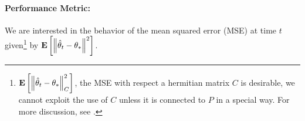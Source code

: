 \paragraph{Performance Metric:}  We are interested in the behavior of the mean squared error (MSE) at time $t$ given\footnote{ $\mathbf{E}\left[\left\| \hat{\theta}_t-\theta_*\right\|_C^2\right]$, the MSE with respect a hermitian matrix $C$ is desirable, we cannot exploit the use of $C$ unless it is connected to $P$ in a special way. For more discussion, see .}
 by $\mathbf{E}\left[\left\| \hat{\theta}_t-\theta_*\right\|^2\right]$.
\begin{comment}
\footnote{ We note here that $\EE{\norm{\thh_t-\ts}_C^2}$ which measures the MSE in the quadratic norm with respect to a positive definite matrix $C\succ 0$. However, unless $C$ has some special structure, it is not possible to exploit this generality in our bounds. Further, when data is bounded $\norm{C}^2$ is also bounded and it is straightforward to see that $\EE{\norm{\thh_t-\ts}}^2_C\leq \norm{C}^2\EE{\norm{\thh_t-\ts}^2}$. So, for the purpose of stating our results we will not use the general quadratic norm, however, will use it when we discuss the work by \cite{bach} in the linear regression setting, where its usage is relevant.}
\end{comment}
